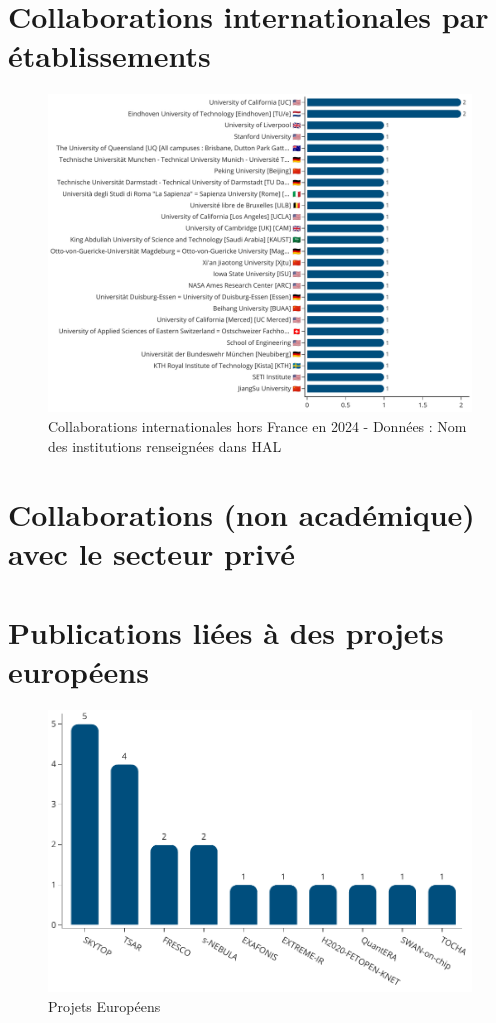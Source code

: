 \documentclass[french, 11pt]{assets/biso}
\begin{document}
\pagebreak

\section{Collaborations internationales par établissements}

\begin{figure}[!h]
  \includegraphics[width=\textwidth]{figures/international_collaborations.pdf}
  \caption{Collaborations internationales hors France en 2024 - Données : Nom des institutions renseignées dans HAL}
  \label{fig_collab_names}
\end{figure}

\pagebreak

\section{Collaborations (non académique) avec le secteur privé}


\pagebreak

\section{Publications liées à des projets européens}

\begin{figure}[!h]
  \includegraphics[width=.8\textwidth]{figures/eu_projects.pdf}
  \centering
  \caption{Projets Européens}
  \label{fig_eu_projects}
\end{figure}
\end{document}
